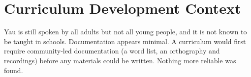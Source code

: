 \documentclass[12pt]{article}
\begin{document}
\section{Curriculum Development Context}
Yau is still spoken by all adults but not all young people, and it is not known to be taught in schools. Documentation appears minimal. A curriculum would first require community-led documentation (a word list, an orthography and recordings) before any materials could be written. Nothing more reliable was found.
\end{document}
